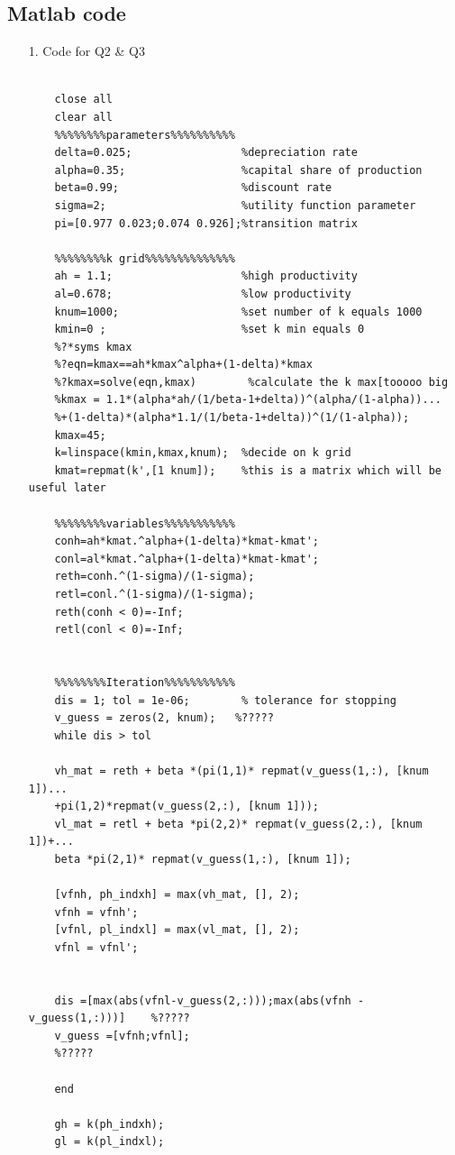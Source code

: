 \documentclass[12pt]{article}
\begin{document}
	\subsection{ Matlab code}
	\begin{enumerate}
		\item[1.]Code for Q2 \& Q3\\
  
  
	\begin{verbatim}

	close all
	clear all
	%%%%%%%%parameters%%%%%%%%%%
	delta=0.025;                 %depreciation rate
	alpha=0.35;                  %capital share of production
	beta=0.99;                   %discount rate
	sigma=2;                     %utility function parameter
	pi=[0.977 0.023;0.074 0.926];%transition matrix
	
	%%%%%%%%k grid%%%%%%%%%%%%%%
	ah = 1.1;                    %high productivity 
	al=0.678;                    %low productivity
	knum=1000;                   %set number of k equals 1000
	kmin=0 ;                     %set k min equals 0
	%?*syms kmax
	%?eqn=kmax==ah*kmax^alpha+(1-delta)*kmax
	%?kmax=solve(eqn,kmax)        %calculate the k max[tooooo big
	%kmax = 1.1*(alpha*ah/(1/beta-1+delta))^(alpha/(1-alpha))...
	%+(1-delta)*(alpha*1.1/(1/beta-1+delta))^(1/(1-alpha));
	kmax=45;
	k=linspace(kmin,kmax,knum);  %decide on k grid
	kmat=repmat(k',[1 knum]);    %this is a matrix which will be useful later
	
	%%%%%%%%variables%%%%%%%%%%%
	conh=ah*kmat.^alpha+(1-delta)*kmat-kmat';
	conl=al*kmat.^alpha+(1-delta)*kmat-kmat';
	reth=conh.^(1-sigma)/(1-sigma);
	retl=conl.^(1-sigma)/(1-sigma);
	reth(conh < 0)=-Inf;
	retl(conl < 0)=-Inf;
	
	
	%%%%%%%%Iteration%%%%%%%%%%%
	dis = 1; tol = 1e-06;        % tolerance for stopping 
	v_guess = zeros(2, knum);   %?????
	while dis > tol
	
	vh_mat = reth + beta *(pi(1,1)* repmat(v_guess(1,:), [knum 1])...
	+pi(1,2)*repmat(v_guess(2,:), [knum 1]));
	vl_mat = retl + beta *pi(2,2)* repmat(v_guess(2,:), [knum 1])+...
	beta *pi(2,1)* repmat(v_guess(1,:), [knum 1]);
	
	[vfnh, ph_indxh] = max(vh_mat, [], 2);
	vfnh = vfnh';
	[vfnl, pl_indxl] = max(vl_mat, [], 2);
	vfnl = vfnl';
	
	
	dis =[max(abs(vfnl-v_guess(2,:)));max(abs(vfnh - v_guess(1,:)))]    %?????
	v_guess =[vfnh;vfnl];
	%?????
	
	end
	
	gh = k(ph_indxh);
	gl = k(pl_indxl);
	

\end{verbatim}
\end{enumerate}
\end{document}
